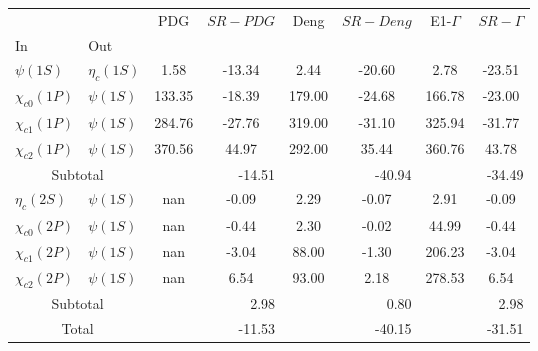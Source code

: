 \begin{tabular}{|l|l|c|c|c|c|c|c|}%
\hline%
&&PDG&$SR-PDG$&Deng&$SR-Deng$&E1-$\Gamma$&$SR-\Gamma$\\%
In&Out&&&&&&\\%
\hline%
$\psi(1S)$&$\eta_{c}(1S)$&1.58&-13.34&2.44&-20.60&2.78&-23.51\\%
$\chi_{c0}(1P)$&$\psi(1S)$&133.35&-18.39&179.00&-24.68&166.78&-23.00\\%
$\chi_{c1}(1P)$&$\psi(1S)$&284.76&-27.76&319.00&-31.10&325.94&-31.77\\%
$\chi_{c2}(1P)$&$\psi(1S)$&370.56&44.97&292.00&35.44&360.76&43.78\\%
\hline%
\hline%
\multicolumn{2}{|c|}{Subtotal}&\multicolumn{2}{|r|}{{-}14.51}&\multicolumn{2}{|r|}{{-}40.94}&\multicolumn{2}{|r|}{{-}34.49}\\%
\hline%
\hline%
$\eta_{c}(2S)$&$\psi(1S)$&nan&-0.09&2.29&-0.07&2.91&-0.09\\%
$\chi_{c0}(2P)$&$\psi(1S)$&nan&-0.44&2.30&-0.02&44.99&-0.44\\%
$\chi_{c1}(2P)$&$\psi(1S)$&nan&-3.04&88.00&-1.30&206.23&-3.04\\%
$\chi_{c2}(2P)$&$\psi(1S)$&nan&6.54&93.00&2.18&278.53&6.54\\%
\hline%
\hline%
\multicolumn{2}{|c|}{Subtotal}&\multicolumn{2}{|r|}{2.98}&\multicolumn{2}{|r|}{0.80}&\multicolumn{2}{|r|}{2.98}\\%
\hline%
\hline%
\multicolumn{2}{|c|}{Total}&\multicolumn{2}{|r|}{{-}11.53}&\multicolumn{2}{|r|}{{-}40.15}&\multicolumn{2}{|r|}{{-}31.51}\\%
\hline%
\end{tabular}